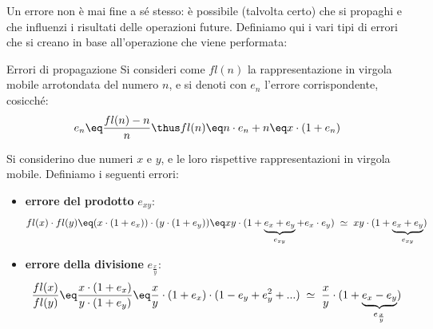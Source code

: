 Un errore non è mai fine a sé stesso: è possibile (talvolta certo) che si propaghi e che influenzi i risultati delle operazioni future. Definiamo qui i vari tipi di errori che si creano in base all'operazione che viene performata:
\begin{definition}{Errori di propagazione}
    Si consideri come $fl(n)$ la rappresentazione in virgola mobile arrotondata del numero $n$, e si denoti con $e_n$ l'errore corrispondente, cosicché:
    \[ e_n \eq \frac{fl(n) - n}{n} \thus fl(n) \eq n \cdot e_n + n \eq x \cdot (1 + e_n) \]

    Si considerino due numeri $x$ e $y$, e le loro rispettive rappresentazioni in virgola mobile. Definiamo i seguenti errori:
    \begin{itemize}
        \item \textbf{errore del prodotto} $e_{xy}$:
        \[ fl(x) \cdot fl(y) \eq (x \cdot (1 + e_x)) \cdot (y \cdot (1 + e_y)) \eq xy \cdot (1 + \underbrace{e_x + e_y}_{e_{xy}} + e_x \cdot e_y) \; \simeq \; xy \cdot (1 + \underbrace{e_x + e_y}_{e_{xy}}) \]

        \item \textbf{errore della divisione} $e_{\frac{x}{y}}$:
        \[ \frac{fl(x)}{fl(y)} \eq \frac{x \cdot (1 + e_x)}{y \cdot (1 + e_y)} \eq \frac{x}{y} \cdot (1 + e_x) \cdot (1 - e_y + e^2_y + ...) \; \simeq \; \frac{x}{y} \cdot (1 + \underbrace{e_x - e_y}_{e_{\frac{x}{y}}}) \]
    \end{itemize}
\end{definition}